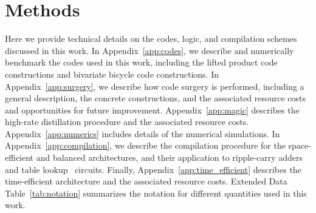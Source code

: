 \documentclass[reprint,twocolumn,secnumarabic,amssymb, aps, prx]{revtex4-2}
\begin{document}
\section*{Methods}
\appendix
Here we provide technical details on the codes, logic, and compilation schemes discussed in this work. In Appendix~\ref{app:codes}, we describe and numerically benchmark the codes used in this work, including the lifted product code constructions and bivariate bicycle code constructions. In Appendix~\ref{app:surgery}, we describe how code surgery is performed, including a general description, the concrete constructions, and the associated resource costs and opportunities for future improvement. Appendix~\ref{app:magic} describes the high-rate distillation procedure and the associated resource costs. Appendix~\ref{app:numerics} includes details of the numerical simulations. In Appendix~\ref{app:compilation}, we describe the compilation procedure for the space-efficient and balanced architectures, and their application to ripple-carry adders~\cite{cuccaro2004new, gidney2018halving} and table lookup~\cite{babbush2018encoding} circuits. Finally, Appendix~\ref{app:time_efficient} describes the time-efficient architecture and the associated resource costs. Extended Data Table~\ref{tab:notation} summarizes the notation for different quantities used in this work.
\end{document}
